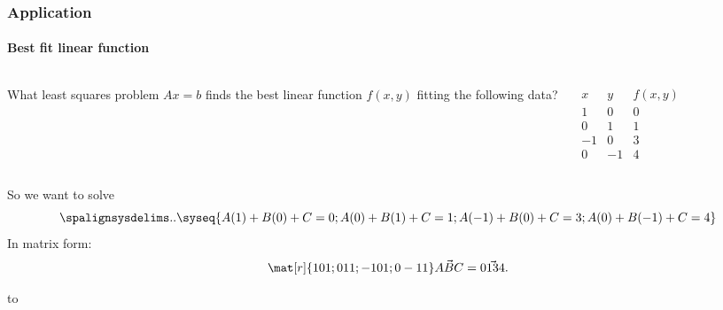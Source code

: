 
\begin{frame}
\frametitle{Application}
\framesubtitle{Best fit linear function}

\begin{columns}[onlytextwidth]
What least squares problem $Ax=b$ finds the best linear function $f(x,y)$
fitting the following data?

\medskip{}
\vskip-1cm
\[\begin{array}{r|r|c}
  x & y & f(x,y) \\\hline
  1 & 0 & 0 \\
  0 & 1 & 1 \\
  -1 & 0 & 3 \\
  0 & -1 & 4
\end{array}\]
\end{columns}

\begin{webonly}
  So we want to solve
  \[\spalignsysdelims..\syseq{
    A(1) + B(0) + C = 0;
    A(0) + B(1) + C = 1;
    A(-1) + B(0) + C = 3;
    A(0) + B(-1) + C = 4
  }\]
  In matrix form:
  \[\mat[r]{
    1 0 1;
    0 1 1;
    -1 0 1;
    0 -1 1
  }\vec{A B C} = \vec{0 1 3 4}.
  \]

\end{webonly}

\pause
\hbox to 

\end{frame}



